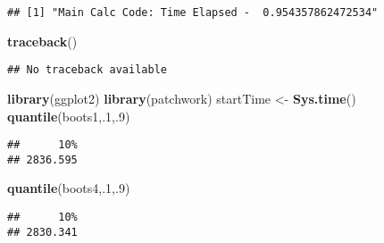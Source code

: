 \documentclass[
]{article}
\newenvironment{Shaded}{\begin{snugshade}}{\end{snugshade}}
\newcommand{\DecValTok}[1]{\textcolor[rgb]{0.00,0.00,0.81}{#1}}
\newcommand{\FunctionTok}[1]{\textcolor[rgb]{0.13,0.29,0.53}{\textbf{#1}}}
\newcommand{\NormalTok}[1]{#1}
\newcommand{\OtherTok}[1]{\textcolor[rgb]{0.56,0.35,0.01}{#1}}
\begin{document}
\begin{verbatim}
## [1] "Main Calc Code: Time Elapsed -  0.954357862472534"
\end{verbatim}

\begin{Shaded}
\begin{Highlighting}[]
\FunctionTok{traceback}\NormalTok{()}
\end{Highlighting}
\end{Shaded}

\begin{verbatim}
## No traceback available
\end{verbatim}

\begin{Shaded}
\begin{Highlighting}[]
\FunctionTok{library}\NormalTok{(ggplot2)}
\FunctionTok{library}\NormalTok{(patchwork)}
\NormalTok{startTime }\OtherTok{\textless{}{-}} \FunctionTok{Sys.time}\NormalTok{()}
\FunctionTok{quantile}\NormalTok{(boots1,.}\DecValTok{1}\NormalTok{,.}\DecValTok{9}\NormalTok{)}
\end{Highlighting}
\end{Shaded}

\begin{verbatim}
##      10% 
## 2836.595
\end{verbatim}

\begin{Shaded}
\begin{Highlighting}[]
\FunctionTok{quantile}\NormalTok{(boots4,.}\DecValTok{1}\NormalTok{,.}\DecValTok{9}\NormalTok{)}
\end{Highlighting}
\end{Shaded}

\begin{verbatim}
##      10% 
## 2830.341
\end{verbatim}
\end{document}
